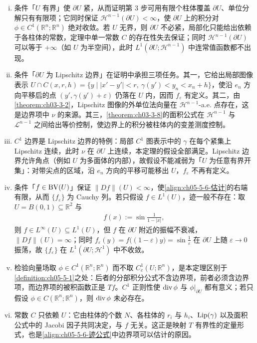 \documentclass[../../main.tex]{subfiles}%
\begin{document}
\begin{remark}\label{remark:ch05-thm-5-6-条件}
\begin{enumerate}[(i)]
\item 条件「$U$ 有界」使 $\partial U$ 紧，从而证明第 3 步可用有限个柱体覆盖 $\partial U$、单位分解只有有限项；它同时保证 $\mathcal{H}^{n-1}(\partial U)<\infty$，使 $\partial U$ 上的积分对 $\phi\in C^1(\mathbb{R}^n;\mathbb{R}^n)$ 绝对收敛。若 $U$ 无界，则 $\partial U$ 不必紧，局部化只能给出依赖于各柱体的常数，定理中单一常数 $C$ 的存在性失去保证；同时 $\mathcal{H}^{n-1}(\partial U)$ 可以等于 $+\infty$（如 $U$ 为半空间），此时 $L^1(\partial U;\mathcal{H}^{n-1})$ 中连常值函数都不出现。
\item 条件「$\partial U$ 为 Lipschitz 边界」在证明中承担三项任务。其一，它给出局部图像表示 $U\cap C(x,r,h)=\{y\mid\lvert x'-y'\rvert<r,\ \gamma(y')<y_n<x_n+h\}$，使沿 $e_n$ 方向平移后的点 $(y',\gamma(y')+\varepsilon)$ 仍落在 $U$ 内，因而 $f_{\varepsilon}$ 有定义。其二，由\cref{theorem:ch03-3-2}，Lipschitz 图像的外单位法向量在 $\mathcal{H}^{n-1}$-a.e. 点存在，这是边界项中 $\nu$ 的来源。其三，\cref{theorem:ch03-3-8}的面积公式在 $\mathcal{H}^{n-1}$ 与 $\mathcal{L}^{n-1}$ 之间给出等价控制，使边界上的积分被柱体内的变差测度控制。%
\item $C^1$ 边界是 Lipschitz 边界的特例：局部 $C^1$ 图表示中的 $\gamma$ 在每个紧集上 Lipschitz 连续，此时 $\nu$ 在 $\partial U$ 上连续，本定理的假设全部满足。Lipschitz 边界允许角点（例如 $U$ 为多面体的内部），故假设不能减弱为「$U$ 为任意有界开集」：对带尖点的区域，沿 $e_n$ 方向的平移可能移出 $U$，$f_{\varepsilon}$ 不再有定义。
\item 条件「$f\in\mathrm{BV}(U)$」保证 $\lVert Df\rVert(U)<\infty$，使\eqref{align:ch05-5-6-估计}的右端有限，从而 $\{f_{\varepsilon}\}$ 为 Cauchy 列。若只假设 $f\in L^1(U)$，迹一般不存在：取 $U=B(0,1)\subseteq\mathbb{R}^2$ 与
\begin{align*}
f(x):=\sin\frac{1}{1-\lvert x\rvert},
\end{align*}
则 $f\in L^{\infty}(U)\subseteq L^1(U)$，但 $f$ 在 $\partial U$ 附近的振幅不衰减，$\lVert Df\rVert(U)=\infty$；同时 $f_{\varepsilon}(y)=f\bigl((1-\varepsilon)y\bigr)=\sin\frac{1}{\varepsilon}$ 在 $\partial U$ 上随 $\varepsilon\to0$ 振荡，故 $\{f_{\varepsilon}\}$ 在 $L^1(\partial U;\mathcal{H}^1)$ 中不收敛。
\item 检验向量场取 $\phi\in C^1(\mathbb{R}^n;\mathbb{R}^n)$ 而不取 $C_c^1(U;\mathbb{R}^n)$，是本定理区别于\cref{definition:ch05-5-1}之处：后者的分部积分公式不含边界项，前者必须含边界项，而边界项的被积函数正是 $Tf$。$C^1$ 正则性使 $\operatorname{div}\phi$ 与 $\phi|_{\partial U}$ 都有意义；若只假设 $\phi\in C(\mathbb{R}^n;\mathbb{R}^n)$，则 $\operatorname{div}\phi$ 未必存在。 %
\item 常数 $C$ 只依赖 $U$：它由柱体的个数 $N$、各柱体的 $r_i$ 与 $h_i$、$\operatorname{Lip}(\gamma)$ 以及面积公式中的 Jacobi 因子共同决定，与 $f$ 无关。这正是映射 $T$ 有界性的定量形式，也是\eqref{align:ch05-5-6-迹公式}中边界项可以估计的原因。
\end{enumerate}
\end{remark}
\end{document}
